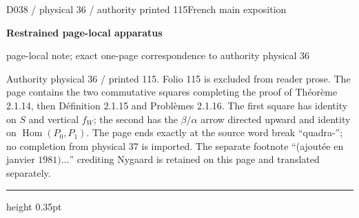 \documentclass[9pt]{article}
\newcommand{\CanonText}[1]{\par{\fontsize{8.0}{9.35}\selectfont\RaggedRight #1\par}\vspace{2.2pt}}
\newcommand{\LayerTitle}{Restrained page-local apparatus}
\begin{document}
\noindent\begin{minipage}[t][\dimexpr\textheight-5pt\relax][t]{\textwidth}
{\sffamily\fontsize{7.3}{8.2}\selectfont\color{Quiet} D038 / physical 36 / authority printed 115\hfill French main exposition}
\par{}\vspace{4.5pt}
{\sffamily\fontsize{10.4}{11.6}\selectfont\bfseries\color{Accent} \LayerTitle}
\par{\sffamily\fontsize{6.7}{7.7}\selectfont\color{Quiet} page-local note; exact one-page correspondence to authority physical 36}
\vspace{5pt}
\CanonText{Authority physical 36 / printed 115. Folio 115 is excluded from reader prose. The page contains the two commutative squares completing the proof of Théorème 2.1.14, then Définition 2.1.15 and Problèmes 2.1.16. The first square has identity on \(S\) and vertical \(f_{W}\); the second has the \(\beta{}/\alpha{}\) arrow directed upward and identity on \(\operatorname{Hom}(P_{0},P_{1})\). The page ends exactly at the source word break “quadra-”; no completion from physical 37 is imported. The separate footnote “(ajoutée en janvier \(1981)\ldots{}\)” crediting Nygaard is retained on this page and translated separately.}
\vfill
{\color{Accent}\hrule height 0.35pt}\vspace{3pt}
\end{minipage}
\newpage
\end{document}
